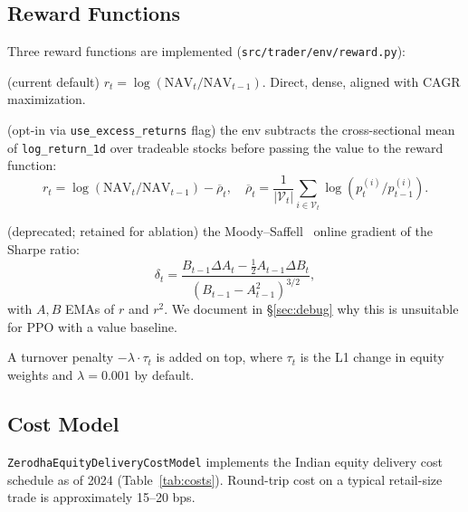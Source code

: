 \documentclass[11pt,a4paper]{article}
\begin{document}
\subsection{Reward Functions}

Three reward functions are implemented (\texttt{src/trader/env/reward.py}):

\begin{description}[leftmargin=*]
\item[\texttt{LogReturn}] (current default) $r_t = \log(\text{NAV}_t / \text{NAV}_{t-1})$.
Direct, dense, aligned with CAGR maximization.

\item[\texttt{ExcessLogReturn}] (opt-in via \texttt{use\_excess\_returns} flag) the env
subtracts the cross-sectional mean of \texttt{log\_return\_1d} over tradeable stocks
before passing the value to the reward function:
\[ r_t = \log(\text{NAV}_t / \text{NAV}_{t-1}) - \overline{\rho}_t,\quad
   \overline{\rho}_t = \frac{1}{|\mathcal{V}_t|} \sum_{i \in \mathcal{V}_t} \log(p^{(i)}_t / p^{(i)}_{t-1}). \]

\item[\texttt{DifferentialSharpe}] (deprecated; retained for ablation) the
Moody--Saffell~\cite{moody2001} online gradient of the Sharpe ratio:
\[ \delta_t = \frac{B_{t-1} \Delta A_t - \tfrac{1}{2} A_{t-1} \Delta B_t}
                   {(B_{t-1} - A_{t-1}^2)^{3/2}}, \]
with $A, B$ EMAs of $r$ and $r^2$. We document in \S\ref{sec:debug} why this
is unsuitable for PPO with a value baseline.
\end{description}

A turnover penalty $-\lambda \cdot \tau_t$ is added on top, where $\tau_t$ is the L1
change in equity weights and $\lambda = 0.001$ by default.

\subsection{Cost Model}

\texttt{ZerodhaEquityDeliveryCostModel} implements the Indian equity delivery cost
schedule as of 2024 (Table~\ref{tab:costs}). Round-trip cost on a typical retail-size
trade is approximately 15--20 bps.
\end{document}
